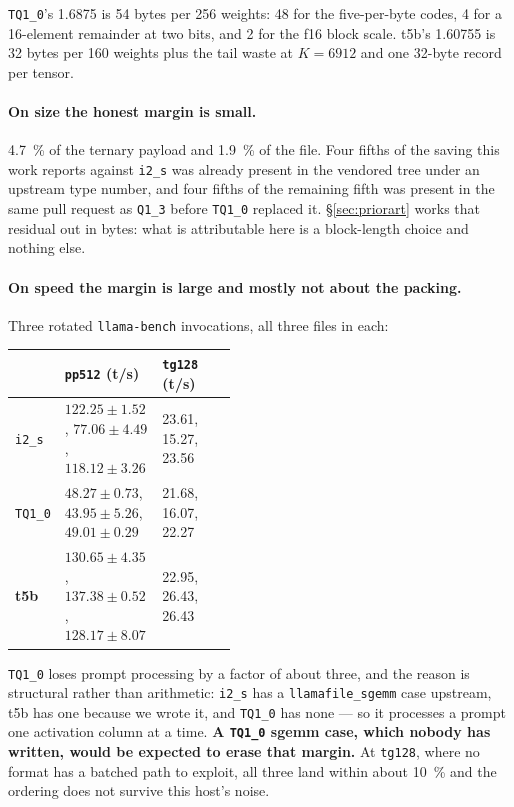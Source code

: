 \documentclass[11pt,a4paper]{article}
\newcommand{\code}[1]{\texttt{#1}}
\begin{document}
\code{TQ1\_0}'s \num{1.6875} is 54 bytes per 256 weights: 48 for the
five-per-byte codes, 4 for a 16-element remainder at two bits, and 2 for the f16
block scale. t5b's \num{1.60755} is 32 bytes per 160 weights plus the tail waste
at $K = 6912$ and one 32-byte record per tensor.

\paragraph{On size the honest margin is small.} \SI{4.7}{\percent} of the
ternary payload and \SI{1.9}{\percent} of the file. Four fifths of the saving
this work reports against \code{i2\_s} was already present in the vendored tree
under an upstream type number, and four fifths of the remaining fifth was
present in the same pull request as \code{Q1\_3} before \code{TQ1\_0} replaced
it. \S\ref{sec:priorart} works that residual out in bytes: what is attributable
here is a block-length choice and nothing else.

\paragraph{On speed the margin is large and mostly not about the packing.}
Three rotated \code{llama-bench} invocations, all three files in each:

\begin{center}
\small
\begin{tabular}{l>{\raggedright\arraybackslash}p{0.44\linewidth}l}
\toprule
 & \code{pp512} (t/s) & \code{tg128} (t/s) \\
\midrule
\code{i2\_s}  & $122.25 \pm 1.52$, $77.06 \pm 4.49$, $118.12 \pm 3.26$ & 23.61, 15.27, 23.56 \\
\code{TQ1\_0} & $48.27 \pm 0.73$, $43.95 \pm 5.26$, $49.01 \pm 0.29$   & 21.68, 16.07, 22.27 \\
\textbf{t5b}  & $130.65 \pm 4.35$, $137.38 \pm 0.52$, $128.17 \pm 8.07$ & 22.95, 26.43, 26.43 \\
\bottomrule
\end{tabular}
\end{center}

\code{TQ1\_0} loses prompt processing by a factor of about three, and the reason
is structural rather than arithmetic: \code{i2\_s} has a
\code{llamafile\_sgemm} case upstream, t5b has one because we wrote it, and
\code{TQ1\_0} has none --- so it processes a prompt one activation column at a
time. \textbf{A \code{TQ1\_0} sgemm case, which nobody has written, would be
expected to erase that margin.} At \code{tg128}, where no format has a batched
path to exploit, all three land within about \SI{10}{\percent} and the ordering
does not survive this host's noise.
\end{document}
